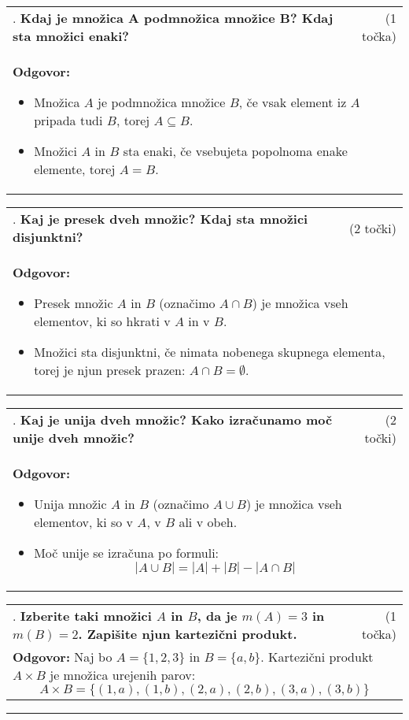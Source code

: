\documentclass[12pt]{article}
\newcounter{vprasanje}[section]
\renewcommand{\thevprasanje}{\roman{vprasanje}}
\newcommand{\vprasanje}[2]{%
  \stepcounter{vprasanje}%
  \textbf{\thevprasanje}. \textbf{#1} & (#2) \\
}
\newcommand{\odgovor}[1]{%
  \multicolumn{2}{p{\dimexpr\textwidth-2\tabcolsep\relax}}{%
    \small \textbf{Odgovor:} #1%
  } \\[1em]%
}
\newcommand{\crta}{\rule{\textwidth}{0.4pt}}
\newcommand{\razmak}[1]{%
  \vspace{#1}
}
\begin{document}
\begin{tabularx}{\textwidth}{X r}
\vprasanje{Kdaj je množica A podmnožica množice B? Kdaj sta množici enaki?}{1 točka}
\odgovor{%

\begin{itemize}
	\item Množica $A$ je podmnožica množice $B$, če vsak element iz $A$ pripada tudi $B$, torej $A \subseteq B$.
	\item Množici $A$ in $B$ sta enaki, če vsebujeta popolnoma enake elemente, torej $A = B$.
\end{itemize}
}
\end{tabularx}

\begin{tabularx}{\textwidth}{X r}
\vprasanje{Kaj je presek dveh množic? Kdaj sta množici disjunktni?}{2 točki}
\odgovor{%

\begin{itemize}
	\item Presek množic $A$ in $B$ (označimo $A \cap B$) je množica vseh elementov, ki so hkrati v $A$ in v $B$.
	\item Množici sta disjunktni, če nimata nobenega skupnega elementa, torej je njun presek prazen: $A \cap B = \emptyset$.
\end{itemize}
}
\end{tabularx}

\begin{tabularx}{\textwidth}{X r}
\vprasanje{Kaj je unija dveh množic? Kako izračunamo moč unije dveh množic?}{2 točki}
\odgovor{%
\begin{itemize}
	\item Unija množic $A$ in $B$ (označimo $A \cup B$) je množica vseh elementov, ki so v $A$, v $B$ ali v obeh.
	\item Moč unije se izračuna po formuli: 
	$$|A \cup B| = |A| + |B| - |A \cap B|$$
\end{itemize}
}
\end{tabularx}

\begin{tabularx}{\textwidth}{X r}
\vprasanje{Izberite taki množici $A$ in $B$, da je $m(A)=3$ in $m(B)=2$. Zapišite njun kartezični produkt.}{1 točka}
\odgovor{%
Naj bo $A = \{1,2,3\}$ in $B = \{a,b\}$. Kartezični produkt $A \times B$ je množica urejenih parov:
$$A \times B = \{(1,a), (1,b), (2,a), (2,b), (3,a), (3,b)\}$$
}
\end{tabularx}

\razmak{0.5em}


\crta
\end{document}
